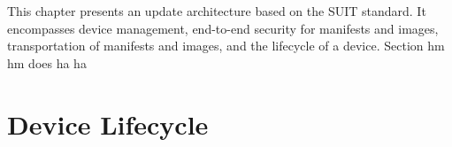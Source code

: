\documentclass[0-thesis.tex]{subfiles}
\begin{document}
This chapter presents an update architecture based on the SUIT standard. It encompasses
device management, end-to-end security for manifests and images, transportation of
manifests and images, and the lifecycle of a device. Section hm hm does ha ha

\section{Device Lifecycle}
\label{sec:device-lifecycle}
\end{document}
